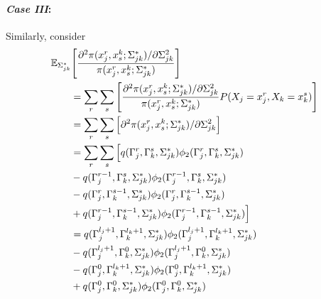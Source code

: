 \begin{condition}
\begin{condition}
        \paragraph{\textit{Case III}:} Similarly, consider
        \begin{align*}
            \MoveEqLeft \mathbb{E}_{\Sigma_{jk}^*}\Bigg[\frac{\partial^2 \pi(x_j^{r},x^k_{s}; \Sigma_{jk}^*)/\partial \Sigma_{jk}^{2}}{\pi(x_j^{r},x^k_{s}; \Sigma_{jk}^*)}\Bigg]          \\
             & = \sum_r \sum_s \Bigg[\frac{\partial^2 \pi(x_j^{r},x^k_{s}; \Sigma_{jk}^*)/\partial \Sigma_{jk}^{2}}{\pi(x_j^{r},x^k_{s}; \Sigma_{jk}^*)} P(X_j = x^r_j, X_k = x^s_k)\Bigg] \\
             & = \sum_r\sum_s \Big[\partial^2 \pi(x_j^{r},x^k_{s}; \Sigma_{jk}^*)/\partial \Sigma_{jk}^{2}\Big]                                                                            \\
             & = \sum_r\sum_s \Big[q(\Gamma_j^r, \Gamma_k^s, \Sigma_{jk}^*)\phi_2(\Gamma_j^r, \Gamma_k^s, \Sigma_{jk}^*)                                                                   \\
             & - q(\Gamma_j^{r-1}, \Gamma_k^s, \Sigma_{jk}^*)\phi_2(\Gamma_j^{r-1}, \Gamma_k^s, \Sigma_{jk}^*)                                                                             \\
             & - q(\Gamma_j^r, \Gamma_k^{s-1}, \Sigma_{jk}^*)\phi_2(\Gamma_j^r, \Gamma_k^{s-1}, \Sigma_{jk}^*)                                                                             \\
             & + q(\Gamma_j^{r-1}, \Gamma_k^{s-1}, \Sigma_{jk}^*)\phi_2(\Gamma_j^{r-1}, \Gamma_k^{s-1}, \Sigma_{jk}^*)\Big]                                                                \\
             & = q(\Gamma_j^{l_j +1}, \Gamma_k^{l_k +1}, \Sigma_{jk}^*)\phi_2(\Gamma_j^{l_j +1}, \Gamma_k^{l_k +1}, \Sigma_{jk}^*)                                                         \\
             & - q(\Gamma_j^{l_j +1}, \Gamma_k^0, \Sigma_{jk}^*)\phi_2(\Gamma_j^{l_j +1}, \Gamma_k^0, \Sigma_{jk}^*)                                                                       \\
             & - q(\Gamma_j^0, \Gamma_k^{l_k +1}, \Sigma_{jk}^*)\phi_2(\Gamma_j^0, \Gamma_k^{l_k +1}, \Sigma_{jk}^*)                                                                       \\
             & + q(\Gamma_j^0, \Gamma_k^0, \Sigma_{jk}^*)\phi_2(\Gamma_j^0, \Gamma_k^0, \Sigma_{jk}^*)                                                                                     \\

\end{align*}
\end{condition}
\end{condition}

